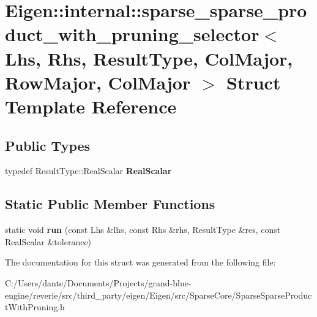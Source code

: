 \hypertarget{struct_eigen_1_1internal_1_1sparse__sparse__product__with__pruning__selector_3_01_lhs_00_01_rhs_3de0f703bb5ed649050c959104d3eb1b}{}\section{Eigen\+::internal\+::sparse\+\_\+sparse\+\_\+product\+\_\+with\+\_\+pruning\+\_\+selector$<$ Lhs, Rhs, Result\+Type, Col\+Major, Row\+Major, Col\+Major $>$ Struct Template Reference}
\label{struct_eigen_1_1internal_1_1sparse__sparse__product__with__pruning__selector_3_01_lhs_00_01_rhs_3de0f703bb5ed649050c959104d3eb1b}
\subsection*{Public Types}
\begin{DoxyCompactItemize}
\item 
\mbox{\label{struct_eigen_1_1internal_1_1sparse__sparse__product__with__pruning__selector_3_01_lhs_00_01_rhs_3de0f703bb5ed649050c959104d3eb1b_af0c0f348f707921999a8bdd2883f18fb}} 
typedef Result\+Type\+::\+Real\+Scalar {\bfseries Real\+Scalar}
\end{DoxyCompactItemize}
\subsection*{Static Public Member Functions}
\begin{DoxyCompactItemize}
\item 
\mbox{\label{struct_eigen_1_1internal_1_1sparse__sparse__product__with__pruning__selector_3_01_lhs_00_01_rhs_3de0f703bb5ed649050c959104d3eb1b_a494213f7a9aea3e86952faa9a7096bb2}} 
static void {\bfseries run} (const Lhs \&lhs, const Rhs \&rhs, Result\+Type \&res, const Real\+Scalar \&tolerance)
\end{DoxyCompactItemize}


The documentation for this struct was generated from the following file\+:\begin{DoxyCompactItemize}
\item 
C\+:/\+Users/dante/\+Documents/\+Projects/grand-\/blue-\/engine/reverie/src/third\+\_\+party/eigen/\+Eigen/src/\+Sparse\+Core/Sparse\+Sparse\+Product\+With\+Pruning.\+h\end{DoxyCompactItemize}
